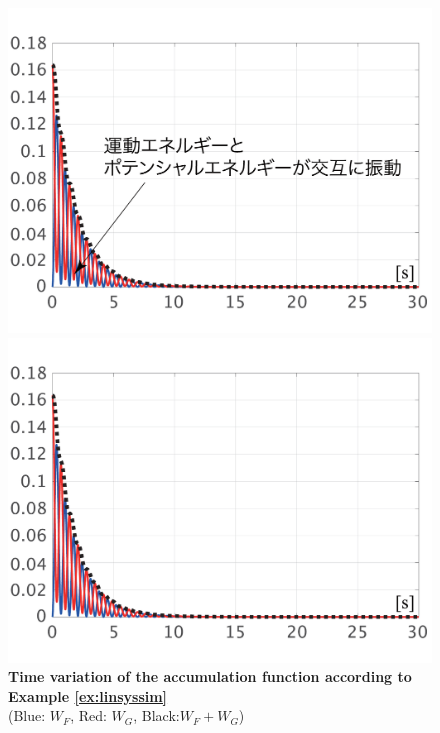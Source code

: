 \documentclass[graybox, envcountchap]{svmult}
\begin{document}
\begin{figure}[t]
  \centering
  {
  \begin{minipage}{0.49\linewidth}
    \centering
    \includegraphics[width = 1.0\linewidth]{figs/losslessW}
    \medskip
  \end{minipage}
  \begin{minipage}{0.49\linewidth}
    \centering
    \includegraphics[width = 1.0\linewidth]{figs/lossyW}
    \medskip
  \end{minipage}
  }
  \medskip
  \caption{\textbf{Time variation of the accumulation function according to Example \ref{ex:linsyssim}}
  \\  \centering(Blue: $W_F$, Red: $W_G$, Black:$W_F+W_G$)}
  \label{fig:LyapW}
\medskip
\end{figure}
\end{document}
